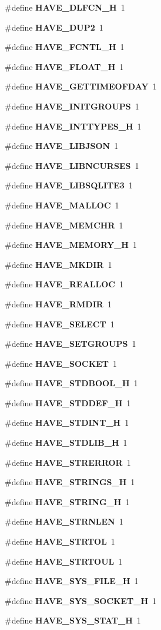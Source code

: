 \begin{DoxyCompactItemize}
\item 
\#define {\bf HAVE\_\-DLFCN\_\-H}~1
\item 
\#define {\bf HAVE\_\-DUP2}~1
\item 
\#define {\bf HAVE\_\-FCNTL\_\-H}~1
\item 
\#define {\bf HAVE\_\-FLOAT\_\-H}~1
\item 
\#define {\bf HAVE\_\-GETTIMEOFDAY}~1
\item 
\#define {\bf HAVE\_\-INITGROUPS}~1
\item 
\#define {\bf HAVE\_\-INTTYPES\_\-H}~1
\item 
\#define {\bf HAVE\_\-LIBJSON}~1
\item 
\#define {\bf HAVE\_\-LIBNCURSES}~1
\item 
\#define {\bf HAVE\_\-LIBSQLITE3}~1
\item 
\#define {\bf HAVE\_\-MALLOC}~1
\item 
\#define {\bf HAVE\_\-MEMCHR}~1
\item 
\#define {\bf HAVE\_\-MEMORY\_\-H}~1
\item 
\#define {\bf HAVE\_\-MKDIR}~1
\item 
\#define {\bf HAVE\_\-REALLOC}~1
\item 
\#define {\bf HAVE\_\-RMDIR}~1
\item 
\#define {\bf HAVE\_\-SELECT}~1
\item 
\#define {\bf HAVE\_\-SETGROUPS}~1
\item 
\#define {\bf HAVE\_\-SOCKET}~1
\item 
\#define {\bf HAVE\_\-STDBOOL\_\-H}~1
\item 
\#define {\bf HAVE\_\-STDDEF\_\-H}~1
\item 
\#define {\bf HAVE\_\-STDINT\_\-H}~1
\item 
\#define {\bf HAVE\_\-STDLIB\_\-H}~1
\item 
\#define {\bf HAVE\_\-STRERROR}~1
\item 
\#define {\bf HAVE\_\-STRINGS\_\-H}~1
\item 
\#define {\bf HAVE\_\-STRING\_\-H}~1
\item 
\#define {\bf HAVE\_\-STRNLEN}~1
\item 
\#define {\bf HAVE\_\-STRTOL}~1
\item 
\#define {\bf HAVE\_\-STRTOUL}~1
\item 
\#define {\bf HAVE\_\-SYS\_\-FILE\_\-H}~1
\item 
\#define {\bf HAVE\_\-SYS\_\-SOCKET\_\-H}~1
\item 
\#define {\bf HAVE\_\-SYS\_\-STAT\_\-H}~1

\end{DoxyCompactItemize}
